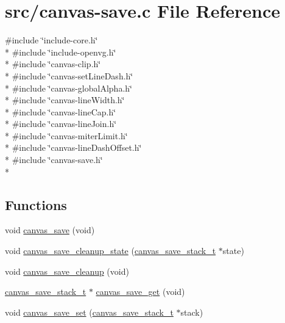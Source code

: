 \hypertarget{canvas-save_8c}{}\section{src/canvas-\/save.c File Reference}
\label{canvas-save_8c}
{\ttfamily \#include \char`\"{}include-\/core.\+h\char`\"{}}\\*
{\ttfamily \#include \char`\"{}include-\/openvg.\+h\char`\"{}}\\*
{\ttfamily \#include \char`\"{}canvas-\/clip.\+h\char`\"{}}\\*
{\ttfamily \#include \char`\"{}canvas-\/set\+Line\+Dash.\+h\char`\"{}}\\*
{\ttfamily \#include \char`\"{}canvas-\/global\+Alpha.\+h\char`\"{}}\\*
{\ttfamily \#include \char`\"{}canvas-\/line\+Width.\+h\char`\"{}}\\*
{\ttfamily \#include \char`\"{}canvas-\/line\+Cap.\+h\char`\"{}}\\*
{\ttfamily \#include \char`\"{}canvas-\/line\+Join.\+h\char`\"{}}\\*
{\ttfamily \#include \char`\"{}canvas-\/miter\+Limit.\+h\char`\"{}}\\*
{\ttfamily \#include \char`\"{}canvas-\/line\+Dash\+Offset.\+h\char`\"{}}\\*
{\ttfamily \#include \char`\"{}canvas-\/save.\+h\char`\"{}}\\*
\subsection*{Functions}
\begin{DoxyCompactItemize}
\item 
void \hyperlink{canvas-save_8c_ae82cc37b7b2b1c9148a08032a0c7cc40}{canvas\+\_\+save} (void)
\item 
void \hyperlink{canvas-save_8c_ad66c58baf950803e925aff072d137d66}{canvas\+\_\+save\+\_\+cleanup\+\_\+state} (\hyperlink{structcanvas__save__stack__t}{canvas\+\_\+save\+\_\+stack\+\_\+t} $\ast$state)
\item 
void \hyperlink{canvas-save_8c_a2e0a1c92b277e1ba569f0c1a6d2eb093}{canvas\+\_\+save\+\_\+cleanup} (void)
\item 
\hyperlink{structcanvas__save__stack__t}{canvas\+\_\+save\+\_\+stack\+\_\+t} $\ast$ \hyperlink{canvas-save_8c_af7ed9425b815c74e76980a76480f31c4}{canvas\+\_\+save\+\_\+get} (void)
\item 
void \hyperlink{canvas-save_8c_af6d5575cb08d948a9d91e1478f21636d}{canvas\+\_\+save\+\_\+set} (\hyperlink{structcanvas__save__stack__t}{canvas\+\_\+save\+\_\+stack\+\_\+t} $\ast$stack)
\end{DoxyCompactItemize}


